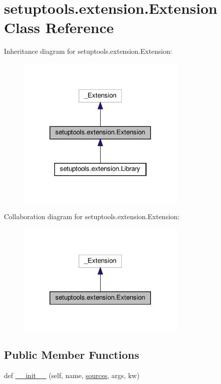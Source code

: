 \hypertarget{classsetuptools_1_1extension_1_1Extension}{}\section{setuptools.\+extension.\+Extension Class Reference}
\label{classsetuptools_1_1extension_1_1Extension}


Inheritance diagram for setuptools.\+extension.\+Extension\+:
\nopagebreak
\begin{figure}[H]
\begin{center}
\leavevmode
\includegraphics[width=233pt]{classsetuptools_1_1extension_1_1Extension__inherit__graph}
\end{center}
\end{figure}


Collaboration diagram for setuptools.\+extension.\+Extension\+:
\nopagebreak
\begin{figure}[H]
\begin{center}
\leavevmode
\includegraphics[width=233pt]{classsetuptools_1_1extension_1_1Extension__coll__graph}
\end{center}
\end{figure}
\subsection*{Public Member Functions}
\begin{DoxyCompactItemize}
\item 
def \hyperlink{classsetuptools_1_1extension_1_1Extension_ab04051fffd82a5063ee962f9f89283e0}{\+\_\+\+\_\+init\+\_\+\+\_\+} (self, name, \hyperlink{classsetuptools_1_1extension_1_1Extension_a267f08175ebbf89924e8f8d6d707c5f8}{sources}, args, kw)
\end{DoxyCompactItemize}
